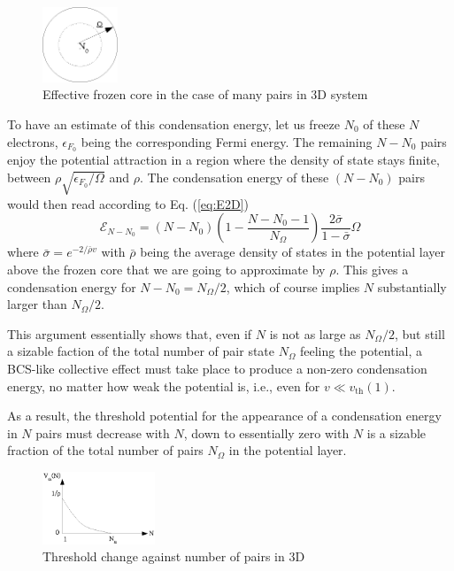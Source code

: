 \documentclass[aps,prb,showpacs,reprint]{revtex4-1}
\begin{document}
\begin{figure}[htb]
	\centering
		\includegraphics[width=0.20\textwidth]{potential.eps}
	\caption{Effective frozen core in the case of many pairs in 3D system}
	\label{fig:potential}
\end{figure}

To have an estimate of this condensation energy, let us freeze $N_0$ of these $N$ electrons, $\epsilon_{F_{0}}$ being the corresponding Fermi energy.  The remaining $N-N_0$ pairs enjoy the potential attraction in a region where the density of state stays finite, between $\rho\sqrt{\epsilon_{F_0}/\Omega}$ and $\rho$.  The condensation energy of these $(N-N_0)$ pairs would then read according to Eq. (\ref{eq:E2D})
\begin{equation}\label{eq:E3D}
{\mathcal{E}}_{N-N_0}=(N-N_0)(1-\frac{N-N_0-1}{N_\Omega})\frac{2\bar\sigma}{1-\bar\sigma}\Omega
\end{equation}
where $\bar{\sigma}=e^{-2/{\bar{\rho}v}}$ with $\bar\rho$ being the average density of states in the potential layer above the frozen core that we are going to approximate by $\rho$. This gives a  condensation energy for $N-N_0=N_\Omega/2$, which of course implies  $N$ substantially larger than $N_\Omega/2$.

This argument essentially shows that, even if $N$ is not as large as $N_\Omega/2$, but still a sizable faction of the total number of pair state $N_\Omega$ feeling the potential,  a BCS-like collective effect  must take place to produce a non-zero condensation energy, no matter how weak the potential is, i.e., even for $v\ll{}v_\text{th}(1)$. 

As a result, the threshold potential for the appearance of a condensation energy in $N$ pairs  must decrease with $N$, down to essentially zero with $N$ is a sizable fraction of the total number of pairs $N_\Omega$ in the potential layer. 

\begin{figure}[htb]
	\centering
		\includegraphics[width=0.30\textwidth]{3dThresholdChange.eps}
	\caption{Threshold change against number of pairs in 3D}
	\label{fig:3dThresholdChange}
\end{figure}
\end{document}
